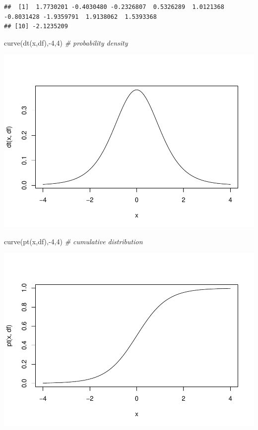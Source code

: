 \documentclass[
]{article}
\newenvironment{Shaded}{\begin{snugshade}}{\end{snugshade}}
\newcommand{\CommentTok}[1]{\textcolor[rgb]{0.56,0.35,0.01}{\textit{#1}}}
\newcommand{\DecValTok}[1]{\textcolor[rgb]{0.00,0.00,0.81}{#1}}
\newcommand{\FunctionTok}[1]{\textcolor[rgb]{0.00,0.00,0.00}{#1}}
\newcommand{\NormalTok}[1]{#1}
\newcommand{\SpecialCharTok}[1]{\textcolor[rgb]{0.00,0.00,0.00}{#1}}
\begin{document}
\begin{verbatim}
##  [1]  1.7730201 -0.4030480 -0.2326807  0.5326289  1.0121368 -0.8031428 -1.9359791  1.9138062  1.5393368
## [10] -2.1235209
\end{verbatim}

\begin{Shaded}
\begin{Highlighting}[]
\FunctionTok{curve}\NormalTok{(}\FunctionTok{dt}\NormalTok{(x,df),}\SpecialCharTok{{-}}\DecValTok{4}\NormalTok{,}\DecValTok{4}\NormalTok{)   }\CommentTok{\# probability density}
\end{Highlighting}
\end{Shaded}

\includegraphics{LECTURE2_files/figure-latex/unnamed-chunk-22-1.pdf}

\begin{Shaded}
\begin{Highlighting}[]
\FunctionTok{curve}\NormalTok{(}\FunctionTok{pt}\NormalTok{(x,df),}\SpecialCharTok{{-}}\DecValTok{4}\NormalTok{,}\DecValTok{4}\NormalTok{)   }\CommentTok{\# cumulative distribution}
\end{Highlighting}
\end{Shaded}

\includegraphics{LECTURE2_files/figure-latex/unnamed-chunk-22-2.pdf}
\end{document}
